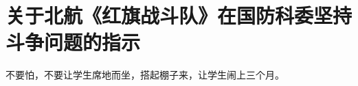 \section[关于北航《红旗战斗队》在国防科委坚持斗争问题的指示（一九六六年八月）]{关于北航《红旗战斗队》在国防科委坚持斗争问题的指示}


不要怕，不要让学生席地而坐，搭起棚子来，让学生闹上三个月。

